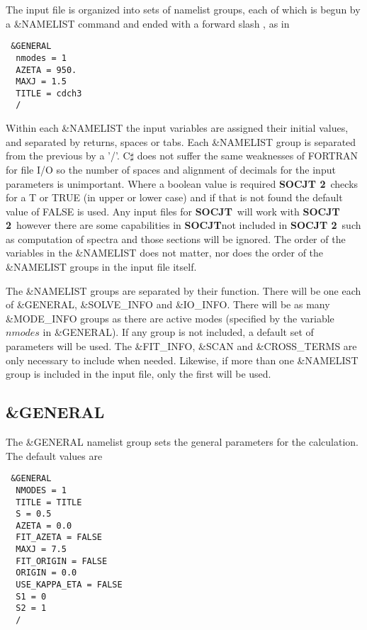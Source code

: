 \documentclass{article}
\newcommand{\socjttwo}{{\bf SOCJT 2}}
\newcommand{\socjt}{{\bf SOCJT}}
\begin{document}
The input file is organized into sets of namelist groups, each of
which is begun by a \&NAMELIST command and ended with a forward slash
\/, as in 
\begin{verbatim}
 &GENERAL 
  nmodes = 1
  AZETA = 950.
  MAXJ = 1.5
  TITLE = cdch3 
  /
\end{verbatim}
Within each \&NAMELIST the input variables are assigned their initial
values, and separated by returns, spaces or tabs. Each \&NAMELIST group is separated from
the previous by a '/'. C$\sharp$ does not suffer the same weaknesses of FORTRAN for file I/O
so the number of spaces and alignment of decimals for the input parameters is unimportant.
Where a boolean value is required \socjttwo\ checks for a T or TRUE (in upper or lower case)
and if that is not found the default value of FALSE is used. Any input files for \socjt\ will work
with \socjttwo\ however there are some capabilities in \socjt not included in \socjttwo\ such as 
computation of spectra and those sections will be ignored. The order of the variables in
the \&NAMELIST does not matter, nor does the order of the \&NAMELIST
groups in the input file itself.

The \&NAMELIST groups are separated by their function. There will be one each of
\&GENERAL, \&SOLVE\_INFO and \&IO\_INFO. There will be as many \&MODE\_INFO groups as there are active modes
(specified by the variable $nmodes$ in \&GENERAL). If any group is not included,
a default set of parameters will be used. The \&FIT\_INFO, \&SCAN and \&CROSS\_TERMS 
are only necessary to include when needed. Likewise, if more than one
\&NAMELIST group is included in the input file, only the first will be
used. 


\subsection{\&GENERAL}

The \&GENERAL namelist group sets the general parameters for the
calculation. The default values are

\begin{verbatim}
 &GENERAL 
  NMODES = 1
  TITLE = TITLE
  S = 0.5
  AZETA = 0.0
  FIT_AZETA = FALSE
  MAXJ = 7.5
  FIT_ORIGIN = FALSE
  ORIGIN = 0.0
  USE_KAPPA_ETA = FALSE
  S1 = 0
  S2 = 1
  /
\end{verbatim}
\end{document}
